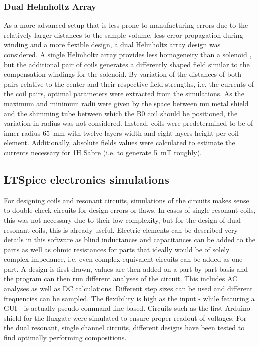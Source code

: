         \subsubsection{Dual Helmholtz Array}\label{simulations:DualHelmholtzArray}
        As a more advanced setup that is less prone to manufacturing errors due to the relatively larger distances to the sample volume, less error propagation during winding and a more flexible design, a dual Helmholtz array design was considered. A single Helmholtz array provides less homogeneity than a solenoid \cite{bienkowski_techniczne_2015}, but the additional pair of coils generates a differently shaped field similar to the compensation windings for the solenoid. By variation of the distances of both pairs relative to the center and their respective field strengths, i.e. the currents of the coil pairs, optimal parameters were extracted from the simulations. As the maximum and minimum radii were given by the space between mu metal shield and the shimming tube between which the B0 coil should be positioned, the variation in radius was not considered. Instead, coils were predetermined to be of inner radius \SI{65}{\mm} with twelve layers width and eight layers height per coil element.
        Additionally, absolute fields values were calculated to estimate the currents necessary for 1H Sabre (i.e. to generate \SI{5}{\milli\tesla} roughly).
    \subsection{LTSpice electronics simulations}
        For designing coils and resonant circuits, simulations of the circuits makes sense to double check circuits for design errors or flaws. In cases of single resonant coils, this was not necessary due to their low complexity, but for the design of dual resonant coils, this is already useful. Electric elements can be described very details in this software as blind inductances and capacitances can be added to the parts as well as ohmic resistances for parts that ideally would be of solely complex impedance, i.e. even complex equivalent circuits can be added as one part.
        A design is first drawn, values are then added on a part by part basis and the program can then run different analyses of the circuit. This includes AC analyses as well as DC calculations. Different step sizes can be used and different frequencies can be sampled. The flexibility is high as the input - while featuring a GUI - is actually pseudo-command line based. Circuits such as the first Arduino shield for the fluxgate were simulated to ensure proper readout of voltages. For the dual resonant, single channel circuits, different designs have been tested to find optimally performing compositions.
